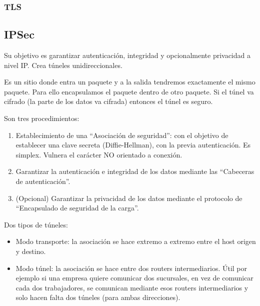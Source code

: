 \subsubsection{TLS}

\subsection{IPSec}
Su objetivo es garantizar autenticación, integridad y opcionalmente privacidad a nivel IP\@. Crea túneles unidireccionales. 

\begin{definicion}[Túnel]
    Es un sitio donde entra un paquete y a la salida tendremos exactamente el mismo paquete. Para ello encapsulamos el paquete dentro de otro paquete. Si el túnel va cifrado (la parte de los datos va cifrada) entonces el túnel es seguro.
\end{definicion}

Son tres procedimientos:
\begin{enumerate}
    \item Establecimiento de una ``Asociación de seguridad'': con el objetivo de establecer una clave secreta (Diffie-Hellman), con la previa autenticación. Es simplex. Vulnera el carácter NO orientado a conexión. 
    \item Garantizar la autenticación e integridad de los datos mediante las ``Cabeceras de autenticación''.
    \item (Opcional) Garantizar la privacidad de los datos mediante el protocolo de ``Encapsulado de seguridad de la carga''.
\end{enumerate}

Dos tipos de túneles:
\begin{itemize}
    \item Modo transporte: la asociación se hace extremo a extremo entre el host origen y destino.
    \item Modo túnel: la asociación se hace entre dos routers intermediarios. Útil por ejemplo si una empresa quiere comunicar dos sucursales, en vez de comunicar cada dos trabajadores, se comunican mediante esos routers intermediarios y solo hacen falta dos túneles (para ambas direcciones).
\end{itemize}


